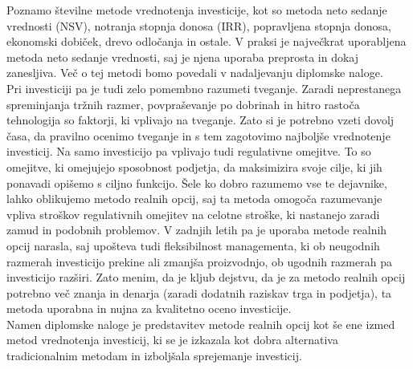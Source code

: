 Poznamo številne metode vrednotenja investicije, kot so metoda neto sedanje vrednosti (NSV), notranja stopnja donosa (IRR), popravljena stopnja donosa, ekonomski dobiček, drevo odločanja in ostale. V praksi je največkrat uporabljena metoda neto sedanje vrednosti, saj je njena uporaba preprosta in dokaj zanesljiva. Več o tej metodi bomo povedali v nadaljevanju diplomske naloge. \\

Pri investiciji pa je tudi zelo pomembno razumeti tveganje. Zaradi neprestanega spreminjanja tržnih razmer, povpraševanje po dobrinah in hitro rastoča tehnologija so faktorji, ki vplivajo na tveganje. Zato si je potrebno vzeti dovolj časa, da pravilno ocenimo tveganje in s tem zagotovimo najboljše vrednotenje investicij. Na samo investicijo pa vplivajo tudi regulativne omejitve. To so omejitve, ki omejujejo sposobnost podjetja, da maksimizira svoje cilje, ki jih ponavadi opišemo s ciljno funkcijo. Šele ko dobro razumemo vse te dejavnike, lahko oblikujemo metodo realnih opcij, saj ta metoda omogoča razumevanje vpliva stroškov regulativnih omejitev na celotne stroške, ki nastanejo zaradi zamud in podobnih problemov. V zadnjih letih pa je uporaba metode realnih opcij narasla, saj upošteva tudi fleksibilnost managementa, ki ob neugodnih razmerah investicijo prekine ali zmanjša proizvodnjo, ob ugodnih razmerah pa investicijo razširi. Zato menim, da je kljub dejstvu, da je za metodo realnih opcij potrebno več znanja in denarja (zaradi dodatnih raziskav trga in podjetja), ta metoda uporabna in nujna za kvalitetno oceno investicije.   \\   

Namen diplomske naloge je predstavitev metode realnih opcij kot še ene izmed metod vrednotenja investicij, ki se je izkazala kot dobra alternativa tradicionalnim metodam in izboljšala sprejemanje investicij. \\

\pagebreak

